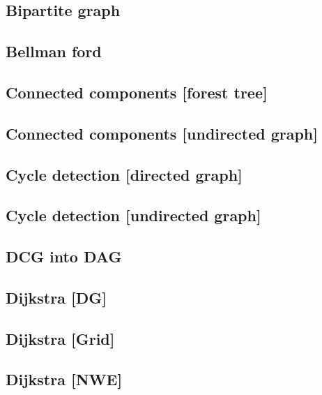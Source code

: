 \subsection{Bipartite graph}
\raggedbottom
\hrulefill
\subsection{Bellman ford}
\raggedbottom
\hrulefill
\subsection{Connected components [forest tree]}
\raggedbottom
\hrulefill
\subsection{Connected components [undirected graph]}
\raggedbottom
\hrulefill
\subsection{Cycle detection [directed graph]}
\raggedbottom
\hrulefill
\subsection{Cycle detection [undirected graph]}
\raggedbottom
\hrulefill
\subsection{DCG into DAG}
\raggedbottom
\hrulefill
\subsection{Dijkstra [DG]}
\raggedbottom
\hrulefill
\subsection{Dijkstra [Grid]}
\raggedbottom
\hrulefill
\subsection{Dijkstra [NWE]}
\raggedbottom
\hrulefill
